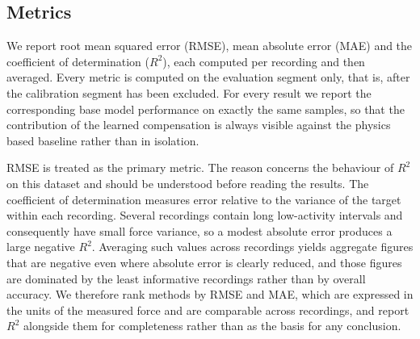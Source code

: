 \subsection{Metrics}
\label{sec:metrics}

We report root mean squared error (RMSE), mean absolute error (MAE) and the
coefficient of determination ($R^2$), each computed per recording and then
averaged. Every metric is computed on the evaluation segment only, that is, after
the calibration segment has been excluded. For every result we report the
corresponding base model performance on exactly the same samples, so that the
contribution of the learned compensation is always visible against the physics
based baseline rather than in isolation.

RMSE is treated as the primary metric. The reason concerns the behaviour of
$R^2$ on this dataset and should be understood before reading the results. The
coefficient of determination measures error relative to the variance of the
target within each recording. Several recordings contain long low-activity
intervals and consequently have small force variance, so a modest absolute error
produces a large negative $R^2$. Averaging such values across recordings yields
aggregate figures that are negative even where absolute error is clearly reduced,
and those figures are dominated by the least informative recordings rather than
by overall accuracy. We therefore rank methods by RMSE and MAE, which are
expressed in the units of the measured force and are comparable across
recordings, and report $R^2$ alongside them for completeness rather than as the
basis for any conclusion.
